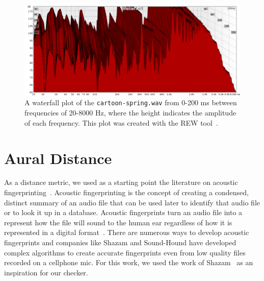 
\begin{figure}[!ht]
\includegraphics[width=\textwidth]{figs/waterfall} 
\caption{A waterfall plot of the \texttt{cartoon-spring.wav} from 0-200 ms between frequencies of 20-8000 Hz, where the height indicates the amplitude of each frequency. This plot was created with the REW tool~\cite{REWTool}.}
\label{fig:waterfall}
\end{figure}

\section{Aural Distance}
\label{sec:distance}

As a distance metric, we used as a starting point the literature on acoustic fingerprinting~\cite{fingerprinting}.
Acoustic fingerprinting is the concept of creating a condensed, distinct summary of an audio file that can be used later to identify that audio file or to look it up in a database.
Acoustic fingerprints turn an audio file into a represent how the file will sound to the human ear regardless of how it is represented in a digital format~\cite{fingerprinting}.
There are numerous ways to develop acoustic fingerprints and companies like Shazam and Sound-Hound have developed complex algorithms to create accurate fingerprints even from low quality files recorded on a cellphone mic.
For this work, we used the work of Shazam~\cite{wang2003industrial} as an inspiration for our checker. 


